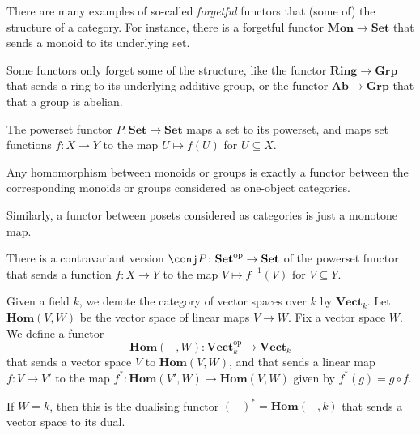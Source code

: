 \documentclass[article, a4paper, 11pt, oneside]{memoir}
\numberwithin{equation}{chapter}
\newcommand{\ncat}[1]{\mathbf{#1}} %
\newcommand{\catSet}{\ncat{Set}}
\newcommand{\catGrp}{\ncat{Grp}}
\newcommand{\catAb}{\ncat{Ab}}
\newcommand{\catMon}{\ncat{Mon}}
\newcommand{\catRing}{\ncat{Ring}}
\newcommand{\catVect}{\ncat{Vect}}
\newcommand{\op}{\mathrm{op}}
\begin{document}
\begin{examplebreak}
    \begin{enumexample}
        \item There are many examples of so-called \emph{forgetful} functors that  (some of) the structure of a category. For instance, there is a forgetful functor $\catMon \to \catSet$ that sends a monoid to its underlying set.
        
        Some functors only forget some of the structure, like the functor $\catRing \to \catGrp$ that sends a ring to its underlying additive group, or the functor $\catAb \to \catGrp$ that  that a group is abelian.

        \item The powerset functor $P \colon \catSet \to \catSet$ maps a set to its powerset, and maps set functions $f \colon X \to Y$ to the map $U \mapsto f(U)$ for $U \subseteq X$.
        
        \item Any homomorphism between monoids or groups is exactly a functor between the corresponding monoids or groups considered as one-object categories.
        
        Similarly, a functor between posets considered as categories is just a monotone map.
    \end{enumexample}
\end{examplebreak}

\renewcommand{\hom}{\mathbf{Hom}}
\newcommand{\blank}{-}

\begin{examplebreak}
    \begin{enumexample}
        \item There is a contravariant version $\conj P \colon \catSet^\op \to \catSet$ of the powerset functor that sends a function $f \colon X \to Y$ to the map $V \mapsto f^{-1}(V)$ for $V \subseteq Y$.
    
        \item Given a field $k$, we denote the category of vector spaces over $k$ by $\catVect_k$. Let $\hom(V,W)$ be the vector space of linear maps $V \to W$. Fix a vector space $W$. We define a functor
        \begin{equation*}
            \hom(\blank,W) \colon \catVect_k^\op \to \catVect_k
        \end{equation*}
        that sends a vector space $V$ to $\hom(V,W)$, and that sends a linear map $f \colon V \to V'$ to the map $f^* \colon \hom(V',W) \to \hom(V,W)$ given by $f^*(g) = g \circ f$.
        
        If $W = k$, then this is the dualising functor $(\blank)^* = \hom(\blank,k)$ that sends a vector space to its dual.
    \end{enumexample}
\end{examplebreak}
\end{document}
